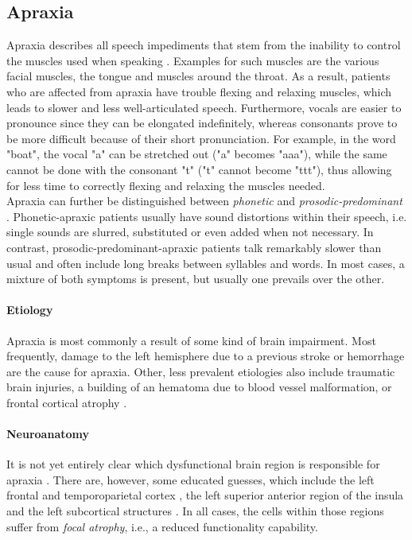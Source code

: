 \documentclass[draft,final]{vutinfth} %
\begin{document}
\subsection{Apraxia}
\label{sec:Apraxia}
Apraxia describes all speech impediments that stem from the inability to control the muscles used when speaking \cite{ogar2005apraxia}. Examples for such muscles are the various facial muscles, the tongue and muscles around the throat. As a result, patients who are affected from apraxia have trouble flexing and relaxing muscles, which leads to slower and less well-articulated speech. Furthermore, vocals are easier to pronounce since they can be elongated indefinitely, whereas consonants prove to be more difficult because of their short pronunciation. For example, in the word "boat", the vocal "a" can be stretched out ("a" becomes "aaa"), while the same cannot be done with the consonant "t" ("t" cannot become "ttt"), thus allowing for less time to correctly flexing and relaxing the muscles needed. 
\\ Apraxia can further be distinguished between \emph{phonetic} and \emph{prosodic-predominant} \cite{utianski2023update}. Phonetic-apraxic patients usually have sound distortions within their speech, i.e. single sounds are slurred, substituted or even added when not necessary. In contrast, prosodic-predominant-apraxic patients talk remarkably slower than usual and often include long breaks between syllables and words. In most cases, a mixture of both symptoms is present, but usually one prevails over the other.

\paragraph{Etiology} Apraxia is most commonly a result of some kind of brain impairment. Most frequently, damage to the left hemisphere due to a previous stroke or hemorrhage are the cause for apraxia. Other, less prevalent etiologies also include traumatic brain injuries, a building of an hematoma due to blood vessel malformation, or frontal cortical atrophy \cite{ziegler2008apraxia}.

\paragraph{Neuroanatomy} It is not yet entirely clear which dysfunctional brain region is responsible for apraxia \cite{ogar2005apraxia}. There are, however, some educated guesses, which include the left frontal and temporoparietal cortex \cite{mcneil2000apraxia}, the left superior anterior region of the insula \cite{dronkers1996new} and the left subcortical structures \cite{peach2004phonemic}. In all cases, the cells within those regions suffer from \emph{focal atrophy}, i.e., a reduced functionality capability.
\end{document}
